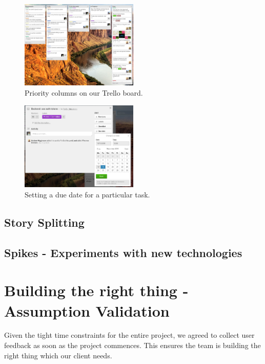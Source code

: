 \documentclass[a4paper]{article}
\begin{document}
\begin{figure}[H]
  \centering
    \includegraphics[width = 0.5\textwidth]{./evaluation/trello-columns.png}

  \caption{Priority columns on our Trello board.}
  \label{fig:columns}
\end{figure}


\begin{figure}[H]
  \centering
    \includegraphics[width = 0.5\textwidth]{./evaluation/trello-due-date.png}

  \caption{Setting a due date for a particular task.}
  \label{fig:deadline}
\end{figure}




\subsection{Story Splitting}




\subsection{Spikes - Experiments with new technologies}




\section{Building the right thing - Assumption Validation}
Given the tight time constraints for the entire project, we agreed to collect
user feedback as soon as the project commences. This ensures the team
is building the right thing which our client needs.
\end{document}
